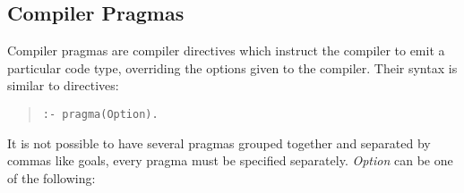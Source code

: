 \subsection{Compiler Pragmas}
Compiler pragmas are compiler directives which instruct the compiler
to emit a particular code type, overriding the options given to the compiler.
Their syntax is similar to directives:
\begin{quote}
\begin{verbatim}
:- pragma(Option).
\end{verbatim}
\end{quote}
It is not possible to have several pragmas grouped together and separated
by commas like goals, every pragma must be specified separately.
{\it Option} can be one of the following:
